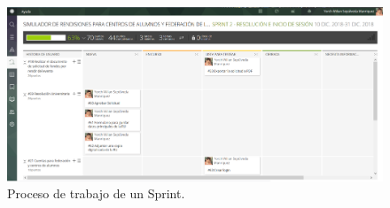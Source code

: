 \begin{figure}[h!]
    \includegraphics[width=\textwidth]{Imagenes/Kanban.png}
    \caption{\label{fig: kanbanSprint} Proceso de trabajo de un Sprint.}
\end{figure}
